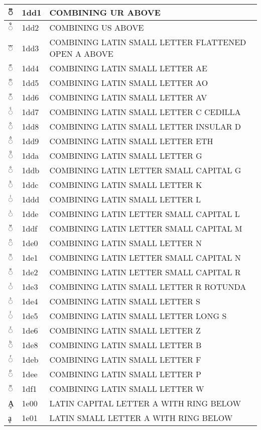 \documentclass[12pt,letterpaper,openany]{book}
\begin{document}
\begin{center}
\begin{supertabular}{|m{0.25in}|m{0.5in}|m{4in}|}
◌᷑ & 1dd1 & COMBINING UR ABOVE\\\hline
◌᷒ & 1dd2 & COMBINING US ABOVE\\\hline
◌ᷓ & 1dd3 & COMBINING LATIN SMALL LETTER FLATTENED OPEN A ABOVE\\\hline
◌ᷔ & 1dd4 & COMBINING LATIN SMALL LETTER AE\\\hline
◌ᷕ & 1dd5 & COMBINING LATIN SMALL LETTER AO\\\hline
◌ᷖ & 1dd6 & COMBINING LATIN SMALL LETTER AV\\\hline
◌ᷗ & 1dd7 & COMBINING LATIN SMALL LETTER C CEDILLA\\\hline
◌ᷘ & 1dd8 & COMBINING LATIN SMALL LETTER INSULAR D\\\hline
◌ᷙ & 1dd9 & COMBINING LATIN SMALL LETTER ETH\\\hline
◌ᷚ & 1dda & COMBINING LATIN SMALL LETTER G\\\hline
◌ᷛ & 1ddb & COMBINING LATIN LETTER SMALL CAPITAL G\\\hline
◌ᷜ & 1ddc & COMBINING LATIN SMALL LETTER K\\\hline
◌ᷝ & 1ddd & COMBINING LATIN SMALL LETTER L\\\hline
◌ᷞ & 1dde & COMBINING LATIN LETTER SMALL CAPITAL L\\\hline
◌ᷟ & 1ddf & COMBINING LATIN LETTER SMALL CAPITAL M\\\hline
◌ᷠ & 1de0 & COMBINING LATIN SMALL LETTER N\\\hline
◌ᷡ & 1de1 & COMBINING LATIN LETTER SMALL CAPITAL N\\\hline
◌ᷢ & 1de2 & COMBINING LATIN LETTER SMALL CAPITAL R\\\hline
◌ᷣ & 1de3 & COMBINING LATIN SMALL LETTER R ROTUNDA\\\hline
◌ᷤ & 1de4 & COMBINING LATIN SMALL LETTER S\\\hline
◌ᷥ & 1de5 & COMBINING LATIN SMALL LETTER LONG S\\\hline
◌ᷦ & 1de6 & COMBINING LATIN SMALL LETTER Z\\\hline
◌ᷨ & 1de8 & COMBINING LATIN SMALL LETTER B\\\hline
◌ᷫ & 1deb & COMBINING LATIN SMALL LETTER F\\\hline
◌ᷮ & 1dee & COMBINING LATIN SMALL LETTER P\\\hline
◌ᷱ & 1df1 & COMBINING LATIN SMALL LETTER W\\\hline
Ḁ & 1e00 & LATIN CAPITAL LETTER A WITH RING BELOW\\\hline
ḁ & 1e01 & LATIN SMALL LETTER A WITH RING BELOW\\\hline

\end{supertabular}
\end{center}
\end{document}
